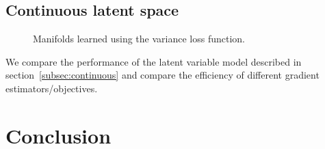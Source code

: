 \documentclass[final,3p,times,twocolumn]{elsarticle}
\begin{document}
\label{sec:results}
\subsection{Continuous latent space}
	\begin{figure}
	\quad
	\quad
	\caption{Manifolds learned using the variance loss function. }
	\label{fig:manifolds}
\end{figure}
\afterpage{\FloatBarrier}

We compare the performance of the latent variable model described in section~\ref{subsec:continuous} and compare the efficiency of different gradient estimators/objectives.

\section{Conclusion}







\end{document}
